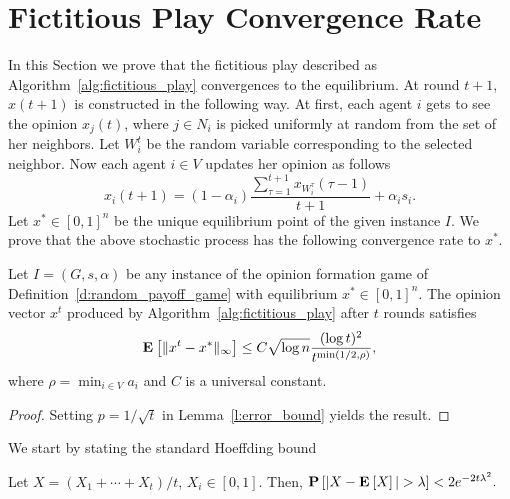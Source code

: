 \section{Fictitious Play Convergence Rate}\label{s:fictitious_convergence}

In this Section we prove that the fictitious play
described as Algorithm~\ref{alg:fictitious_play} convergences
to the equilibrium.
At round $t+1$, $x(t+1)$ is constructed in the following way.
At first, each agent $i$ gets to see
the opinion $x_j(t)$, where $j \in N_i$ is picked uniformly at random
from the set of her neighbors.  Let $W_i^t$ be the random variable
corresponding to the selected neighbor.
Now each agent $i \in V$ updates her opinion as follows
\[
  x_i(t+1) =
  (1-\alpha_i)\frac{\sum_{\tau=1}^{t+1} x_{W_i^\tau}(\tau-1)}{t+1}
  + \alpha_i s_i.
\]
Let $x^* \in [0,1]^n$ be the unique equilibrium point of the given instance $I$.
We prove that the above stochastic process has the following convergence
rate to $x^*$.
\begin{theorem}
  Let $I = (G,s, \alpha)$ be any instance of the opinion formation
  game of Definition~\ref{d:random_payoff_game} with equilibrium
  $x^* \in [0,1]^n$.  The opinion vector $x^t$ produced by
  Algorithm~\ref{alg:fictitious_play} after $t$ rounds satisfies
  \[
    \bm{\mathrm{E}}_{} \left[ \| x^t - x^* \|_{\infty} \right] \leq
    C \sqrt{\log n}\frac{(\log t)^{2}}{t^{\min(1/2,\rho)}},
  \]
  where $\rho = \min_{i \in V} a_i$ and $C$ is a universal constant.
\end{theorem}
\begin{proof}
  Setting $p = 1/\sqrt{t}$ in Lemma~\ref{l:error_bound} yields
  the result.
\end{proof}

We start by stating the standard Hoeffding bound

\begin{lemma}\label{l:hoeffding}
  Let $X = (X_1 +\cdots + X_t) /t$, $X_i \in [0,1]$.
  Then,
  \(
    \Prob{|X - \Exp{X} | > \lambda} < 2 e^{-2 t \lambda^2}.
  \)
\end{lemma}

